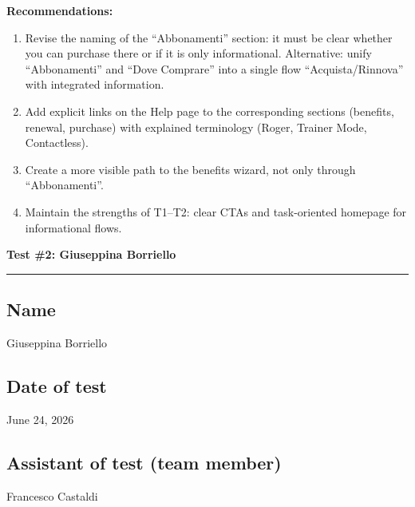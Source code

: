 ﻿\documentclass[11pt,a4paper]{article}
\begin{document}
\begin{tcolorbox}[base]
\noindent\textbf{Recommendations:}
\begin{enumerate}[leftmargin=*]
  \item Revise the naming of the ``Abbonamenti'' section:
  it must be clear whether you can purchase there or if it is only
  informational. Alternative: unify ``Abbonamenti'' and
  ``Dove Comprare'' into a single flow ``Acquista/Rinnova''
  with integrated information.
  \item Add explicit links on the Help page to
  the corresponding sections (benefits, renewal, purchase)
  with explained terminology (Roger, Trainer Mode, Contactless).
  \item Create a more visible path to the benefits
  wizard, not only through ``Abbonamenti''.
  \item Maintain the strengths of T1--T2: clear CTAs and
  task-oriented homepage for informational flows.
\end{enumerate}
\end{tcolorbox}


\newpage
\begin{center}
  {\color{primaryColor}\large\bfseries Test \#2: Giuseppina Borriello}\\
  \vspace{0.1cm}
  \color{borderColor}\hrule
\end{center}

\vspace{0.5cm}

\subsection*{Name}
\begin{tcolorbox}[base]
Giuseppina Borriello
\end{tcolorbox}

\subsection*{Date of test}
\begin{tcolorbox}[base]
June 24, 2026
\end{tcolorbox}

\subsection*{Assistant of test (team member)}
\begin{tcolorbox}[base]
Francesco Castaldi
\end{tcolorbox}
\end{document}
